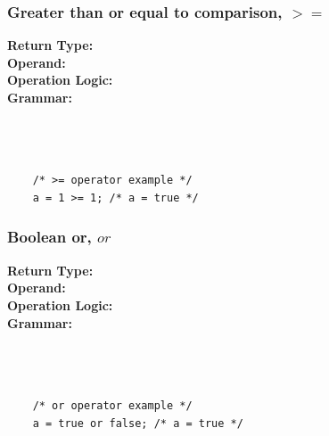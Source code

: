 \documentclass{article}
\begin{document}
    \subsubsection{Greater than or equal to comparison, $>=$}
    \textbf{Return Type:}\\
    \textbf{Operand:}\\
    \textbf{Operation Logic:}\\
    \textbf{Grammar:}\\
    \\
    \\
    \\
    \begin{lstlisting}
    /* >= operator example */
    a = 1 >= 1; /* a = true */
    \end{lstlisting}
    
    \subsubsection{Boolean or, $or$}
    \textbf{Return Type:}\\
    \textbf{Operand:}\\
    \textbf{Operation Logic:}\\
    \textbf{Grammar:}\\
    \\
    \\
    \\
    \begin{lstlisting}
    /* or operator example */
    a = true or false; /* a = true */
    \end{lstlisting}
    
\end{document}
